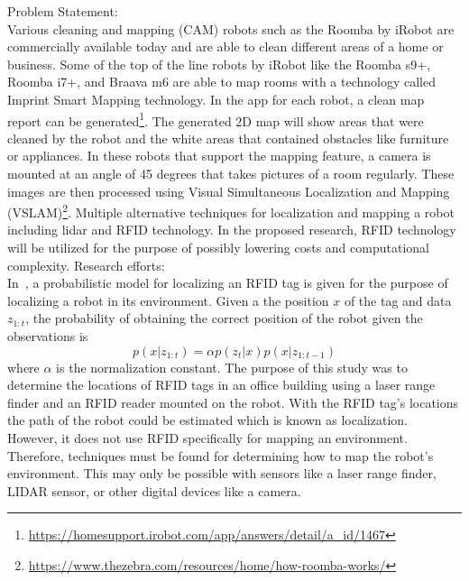 \documentclass[fontsize=11pt, %
                             paper=a4, %
                             twoside, %
                             captions=tableheading,
                             index=totoc,
                             hyperref]{labbook}
\begin{document}
\begin{addmargin}[0cm]{0cm} %

\pagestyle{scrheadings} %


Problem Statement:\\
Various cleaning and mapping (CAM) robots such as the Roomba by iRobot are commercially available today and are able to clean different areas of a home or business. Some of the top of the line robots by iRobot like the Roomba s9+, Roomba i7+, and Braava m6 are able to map rooms with a technology called Imprint Smart Mapping technology. In the app for each robot, a clean map report can be generated\footnote{\url{https://homesupport.irobot.com/app/answers/detail/a_id/1467}}. The generated 2D map will show areas that were cleaned by the robot and the white areas that contained obstacles like furniture or appliances. In these robots that support the mapping feature, a camera is mounted at an angle of 45 degrees that takes pictures of a room regularly. These images are then processed using Visual Simultaneous Localization and Mapping (VSLAM)\footnote{\url{https://www.thezebra.com/resources/home/how-roomba-works/}}. Multiple alternative techniques for localization and mapping a robot including lidar and RFID technology. In the proposed research, RFID technology will be utilized for the purpose of possibly lowering costs and computational complexity.
\smallbreak\noindent
Research efforts:\\
In~\cite{hahnel2004}, a probabilistic model for localizing an RFID tag is given for the purpose of localizing a robot in its environment. Given a the position $x$ of the tag and data $z_{1:t}$, the probability of obtaining the correct position of the robot given the observations is 
\[
p(x|z_{1:t})=\alpha p(z_t \vert x) p(x \vert z_{1:t-1})
\]
where $\alpha$ is the normalization constant. The purpose of this study was to determine the locations of RFID tags in an office building using a laser range finder and an RFID reader mounted on the robot. With the RFID tag's locations the path of the robot could be estimated which is known as localization. However, it does not use RFID specifically for mapping an environment. Therefore, techniques must be found for determining how to map the robot's environment. This may only be possible with sensors like a laser range finder, LIDAR sensor, or other digital devices like a camera.


\end{addmargin}
\end{document}
